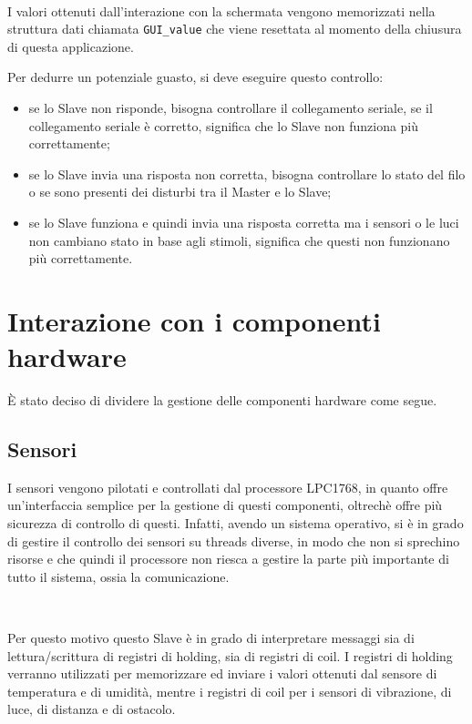 \documentclass[a4paper,titlepage]{book}
\newcommand{\itema}{\begin{itemize}[noitemsep,topsep=10pt,parsep=5pt,partopsep=10pt]}
\newcommand{\code}{\lstinline}
\begin{document}
~

I valori ottenuti dall'interazione con la schermata vengono memorizzati nella struttura dati chiamata \code!GUI_value! che viene resettata al momento della chiusura di questa applicazione.

Per dedurre un potenziale guasto, si deve eseguire questo controllo:

\itema

\item se lo Slave non risponde, bisogna controllare il collegamento seriale, se il collegamento seriale è corretto, significa che lo Slave non funziona più correttamente;

\item se lo Slave invia una risposta non corretta, bisogna controllare lo stato del filo o se sono presenti dei disturbi tra il Master e lo Slave;

\item se lo Slave funziona e quindi invia una risposta corretta ma i sensori o le luci non cambiano stato in base agli stimoli, significa che questi non funzionano più correttamente.

\end{itemize}

\section{Interazione con i componenti hardware}

È stato deciso di dividere la gestione delle componenti hardware come segue.

\subsection{Sensori}

I sensori vengono pilotati e controllati dal processore LPC1768, in quanto offre un'interfaccia semplice per la gestione di questi componenti, oltrechè offre più sicurezza di controllo di questi. Infatti, avendo un sistema operativo, si è in grado di gestire il controllo dei sensori su threads diverse, in modo che non si sprechino risorse e che quindi il processore non riesca a gestire la parte più importante di tutto il sistema, ossia la comunicazione.

~

Per questo motivo questo Slave è in grado di interpretare messaggi sia di lettura/scrittura di registri di holding, sia di registri di coil. I registri di holding verranno utilizzati per memorizzare ed inviare i valori ottenuti dal sensore di temperatura e di umidità, mentre i registri di coil per i sensori di vibrazione, di luce, di distanza e di ostacolo.
\end{document}
